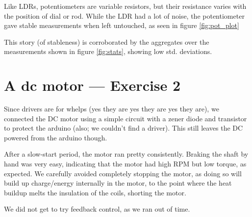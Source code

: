 \documentclass[a4paper, titlepage]{report}
\renewcommand{\%}{\scalebox{.9}{\oldpct}}
\begin{document}
Like LDRs, potentiometers are variable resistors, but their resistance varies
with the position of dial or rod. While the LDR had a lot of noise, the
potentiometer gave stable measurements when left untouched, as seen in figure
\ref{fig:pot_plot}

This story (of stableness) is corroborated by the aggregates over the
measurements shown in figure \ref{fig:stats}, showing low std. deviations.

\section*{A dc motor --- Exercise 2}
Since drivers are for whelps (yes they are yes they are yes they are), we
connected the DC motor using a simple circuit with a zener diode and transistor
to protect the arduino (also; we couldn't find a driver). This still leaves the
DC powered from the arduino though.

After a slow-start period, the motor ran pretty consistently. Braking the shaft
by hand was very easy, indicating that the motor had high RPM but low torque, as
expected. We carefully avoided completely stopping the motor, as doing so will
build up charge/energy internally in the motor, to the point where the heat
buildup melts the insulation of the coils, shorting the motor.

We did not get to try feedback control, as we ran out of time.
\end{document}
